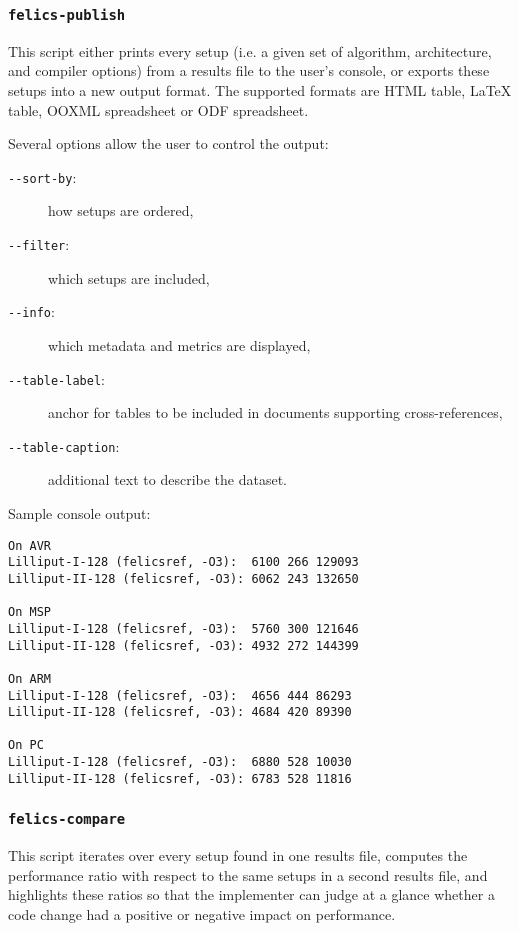 \documentclass{article}
\begin{document}
\subsubsection{\texttt{felics-publish}}

This script either prints every setup (i.e. a given set of algorithm,
architecture, and compiler options) from a results file to the user's
console, or exports these setups into a new output format.  The
supported formats are HTML table, \LaTeX{} table, OOXML spreadsheet or
ODF spreadsheet.

Several options allow the user to control the output:

\begin{description}
\item[\texttt{-{}-sort-by}:] how setups are ordered,
\item[\texttt{-{}-filter}:] which setups are included,
\item[\texttt{-{}-info}:] which metadata and metrics are displayed,
\item[\texttt{-{}-table-label}:] anchor for tables to be included in
  documents supporting cross-references,
\item[\texttt{-{}-table-caption}:] additional text to describe the
  dataset.
\end{description}

Sample console output:

\begin{verbatim}
On AVR
Lilliput-I-128 (felicsref, -O3):  6100 266 129093
Lilliput-II-128 (felicsref, -O3): 6062 243 132650

On MSP
Lilliput-I-128 (felicsref, -O3):  5760 300 121646
Lilliput-II-128 (felicsref, -O3): 4932 272 144399

On ARM
Lilliput-I-128 (felicsref, -O3):  4656 444 86293
Lilliput-II-128 (felicsref, -O3): 4684 420 89390

On PC
Lilliput-I-128 (felicsref, -O3):  6880 528 10030
Lilliput-II-128 (felicsref, -O3): 6783 528 11816
\end{verbatim}

\subsubsection{\texttt{felics-compare}}

This script iterates over every setup found in one results file,
computes the performance ratio with respect to the same setups in a
second results file, and highlights these ratios so that the
implementer can judge at a glance whether a code change had a positive
or negative impact on performance.
\end{document}
